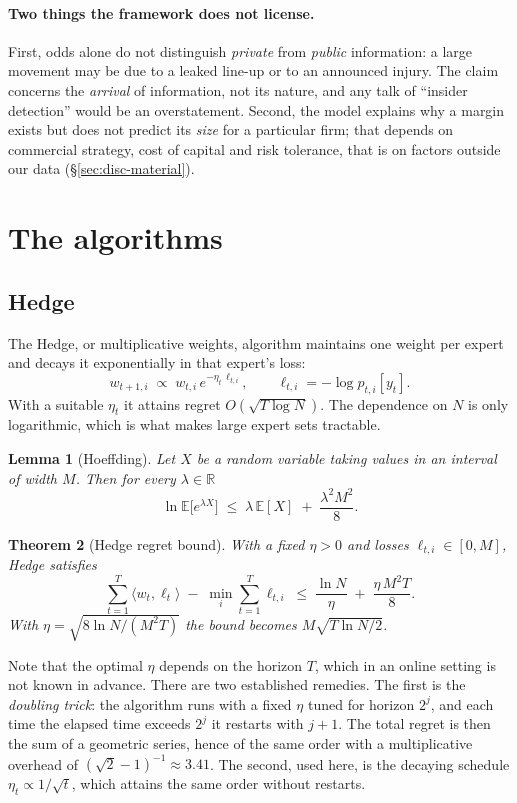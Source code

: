 \documentclass[12pt,a4paper,oneside]{report}
\renewcommand{\_}{\oldunderscore\allowbreak}
\theoremstyle{definition}
\theoremstyle{plain}
\newtheorem{theorem}{Theorem}[chapter]
\newtheorem{lemma}[theorem]{Lemma}
\theoremstyle{remark}
\begin{document}
\paragraph{Two things the framework does not license.} First, odds alone do not distinguish
\emph{private} from \emph{public} information: a large movement may be due to a leaked line-up
or to an announced injury. The claim concerns the \emph{arrival} of information, not its
nature, and any talk of ``insider detection'' would be an overstatement. Second, the model
explains why a margin exists but does not predict its \emph{size} for a particular firm; that
depends on commercial strategy, cost of capital and risk tolerance, that is on factors outside
our data (\S\ref{sec:disc-material}).

\section{The algorithms}

\subsection{Hedge}

The Hedge, or multiplicative weights, algorithm maintains one weight per expert and decays it
exponentially in that expert's loss:
\[
w_{t+1,i} \;\propto\; w_{t,i}\, e^{-\eta_t\, \ell_{t,i}},
\qquad \ell_{t,i} = -\log p_{t,i}[y_t].
\]
With a suitable $\eta_t$ it attains regret $O(\sqrt{T \log N})$. The dependence on $N$ is only
logarithmic, which is what makes large expert sets tractable.

\begin{lemma}[Hoeffding]
\label{lem:hoeffding}
Let $X$ be a random variable taking values in an interval of width $M$. Then for every
$\lambda\in\mathbb{R}$
\[
\ln \mathbb{E}\big[e^{\lambda X}\big] \;\leq\; \lambda\, \mathbb{E}[X] \;+\; \frac{\lambda^2 M^2}{8}.
\]
\end{lemma}

\begin{theorem}[Hedge regret bound]
\label{thm:hedge}
With a fixed $\eta>0$ and losses $\ell_{t,i}\in[0,M]$, Hedge satisfies
\[
\sum_{t=1}^{T}\langle w_t, \ell_t\rangle \;-\; \min_i \sum_{t=1}^{T}\ell_{t,i}
\;\leq\; \frac{\ln N}{\eta} \;+\; \frac{\eta\, M^2 T}{8}.
\]
With $\eta = \sqrt{8\ln N/(M^2T)}$ the bound becomes $M\sqrt{T \ln N / 2}$.
\end{theorem}

Note that the optimal $\eta$ depends on the horizon $T$, which in an online setting is not
known in advance. There are two established remedies. The first is the \emph{doubling trick}:
the algorithm runs with a fixed $\eta$ tuned for horizon $2^j$, and each time the elapsed time
exceeds $2^j$ it restarts with $j\!+\!1$. The total regret is then the sum of a geometric
series, hence of the same order with a multiplicative overhead of
$(\sqrt{2}-1)^{-1}\!\approx\!3.41$. The second, used here, is the decaying schedule
$\eta_t \propto 1/\sqrt{t}$, which attains the same order without restarts.
\end{document}
